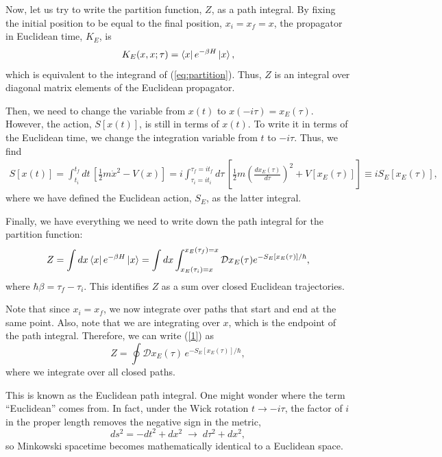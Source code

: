 \documentclass[12pt,a4paper]{article}
\begin{document}
Now, let us try to write the partition function, $Z$, as a path integral.
By fixing the initial position to be equal to the final position, $x_i=x_f=x$, the propagator in Euclidean time, $K_E$, is
\begin{equation}
    K_E(x,x;\tau) = \bra{x}e^{-\beta H}\ket{x},
\end{equation}
which is equivalent to the integrand of (\ref{eq:partition}). Thus, $Z$ is an integral over diagonal matrix elements of the Euclidean propagator.

Then, we need to change the variable from $x(t)$ to $x(-i\tau) =  x_E(\tau)$.
However, the action, $S[x(t)]$, is still in terms of $x(t)$.
To write it in terms of the Euclidean time, we change the integration variable from $t$ to $-i\tau$.
Thus, we find
\begin{equation}
\begin{aligned}
    S[x(t)] = \int^{t_f}_{t_i} dt \,\left[\frac{1}{2}m\dot{x}^2 - V(x)\right]
    = i\int^{\tau_f = it_f}_{\tau_i=it_i}d\tau \,\left[\frac{1}{2}m\left(\frac{dx_E(\tau)}{d\tau}\right)^2 + V[x_E(\tau)]\right]
    \equiv i S_E[x_E(\tau)],
\end{aligned}
\end{equation}
where we have defined the Euclidean action, $S_E$, as the latter integral.

Finally, we have everything we need to write down the path integral for the partition function:
\begin{equation}
    Z = \int dx \bra{x}e^{-\beta H}\ket{x}
      = \int dx \int_{x_E(\tau_i)=x}^{x_E(\tau_f)=x} \mathcal{D}x_E(\tau)e^{-S_E[x_E(\tau)]/\hbar},
    \label{1}
\end{equation}
where $\hbar\beta = \tau_f-\tau_i$. This identifies $Z$ as a sum over closed Euclidean trajectories.

Note that since $x_i=x_f$, we now integrate over paths that start and end at the same point.
Also, note that we are integrating over $x$, which is the endpoint of the path integral.
Therefore, we can write (\ref{1}) as
\begin{equation}
    Z = \oint \mathcal{D}x_E(\tau) \, e^{-S_E[x_E(\tau)]/\hbar},
\end{equation}
where we integrate over all closed paths.

This is known as the Euclidean path integral.
One might wonder where the term ``Euclidean'' comes from.
In fact, under the Wick rotation $t \to -i\tau$, the factor of $i$ in the proper length removes the negative sign in the metric,
\[
ds^2 = -dt^2 + dx^2 \;\longrightarrow\; d\tau^2 + dx^2,
\]
so Minkowski spacetime becomes mathematically identical to a Euclidean space.
\end{document}
